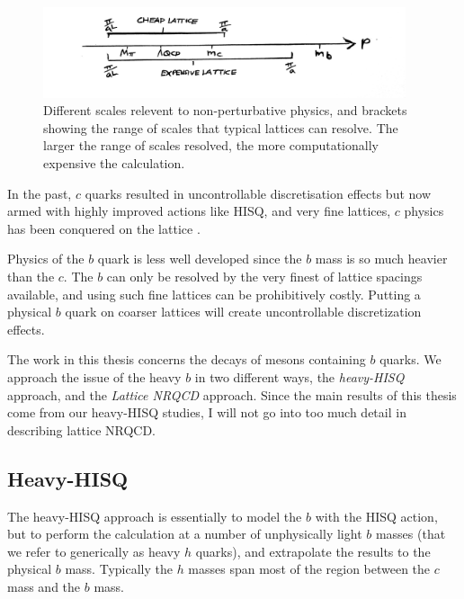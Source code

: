     \begin{figure}
      \vspace{-10pt}
      \begin{center}
        \includegraphics[width=
          0.95\textwidth]{images/scales.jpg}
      \end{center}
      \vspace{-15pt}
      \caption{Different scales relevent to non-perturbative physics, and brackets showing the range of scales that typical lattices can resolve. The larger the range of scales resolved, the more computationally expensive the calculation.}
    \end{figure}

    In the past, $c$ quarks resulted in uncontrollable discretisation effects but now armed with highly improved actions like HISQ, and very fine lattices, $c$ physics has been conquered on the lattice \cite{Follana:2006rc,Allison:2008xk,Davies:2010ip,Donald:2012ga}.

    Physics of the $b$ quark is less well developed since the $b$ mass is so much heavier than the $c$. The $b$ can only be resolved by the very finest of lattice spacings available, and using such fine lattices can be prohibitively costly. Putting a physical $b$ quark on coarser lattices will create uncontrollable discretization effects.
    
    The work in this thesis concerns the decays of mesons containing $b$ quarks. We approach the issue of the heavy $b$ in two different ways, the {\it{heavy-HISQ}} approach, and the {\it{Lattice NRQCD}} approach. Since the main results of this thesis come from our heavy-HISQ studies, I will not go into too much detail in describing lattice NRQCD.

    \subsection{Heavy-HISQ}

    The heavy-HISQ approach is essentially to model the $b$ with the HISQ action, but to perform the calculation at a number of unphysically light $b$ masses (that we refer to generically as heavy $h$ quarks), and extrapolate the results to the physical $b$ mass. Typically the $h$ masses span most of the region between the $c$ mass and the $b$ mass.

